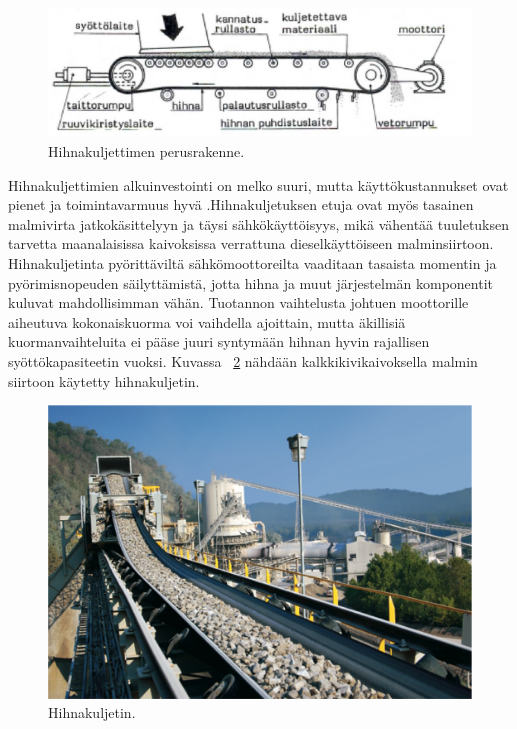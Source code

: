 \documentclass[finnish,12pt,a4paper,pdftex,elec,utf8]{aaltothesis}
\begin{document}
\begin{figure}[H]
	\begin{center}
	\includegraphics[scale=0.75]{hihnakuljetin_rakenne}
	\end{center}
	\caption{Hihnakuljettimen perusrakenne.
		\cite{Ruokolainen}}
	\label{fig:hihnakuljetin_rakenne}
\end{figure}

\noindent
Hihnakuljettimien alkuinvestointi on melko suuri, mutta käyttökustannukset ovat pienet ja toimintavarmuus hyvä \cite{Hakapää}.Hihnakuljetuksen etuja ovat myös tasainen malmivirta jatkokäsittelyyn ja täysi sähkökäyttöisyys, mikä vähentää tuuletuksen tarvetta maanalaisissa kaivoksissa verrattuna dieselkäyttöiseen malminsiirtoon. Hihnakuljetinta pyörittäviltä sähkömoottoreilta vaaditaan tasaista momentin ja pyörimisnopeuden säilyttämistä, jotta hihna ja muut järjestelmän komponentit kuluvat mahdollisimman vähän. Tuotannon vaihtelusta johtuen moottorille aiheutuva kokonaiskuorma voi vaihdella ajoittain, mutta äkillisiä kuormanvaihteluita ei pääse juuri syntymään hihnan hyvin rajallisen syöttökapasiteetin vuoksi. Kuvassa ~\ref{fig:conveyor} nähdään kalkkikivikaivoksella malmin siirtoon käytetty hihnakuljetin.

\begin{figure}[H]
	\begin{center}
	\includegraphics[scale=0.6]{conveyor}
	\end{center}
	\caption{Hihnakuljetin.
		\cite{conveyor}}
	\label{fig:conveyor}
\end{figure}
\end{document}
